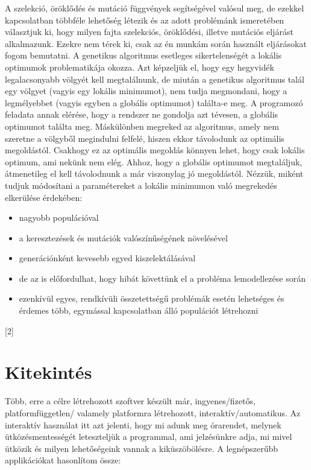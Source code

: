 \documentclass[12pt,a4paper]{report}
\begin{document}
A szelekció, öröklődés és mutáció függvények segítségével valósul meg, de ezekkel
kapcsolatban többféle lehetőség létezik és az adott problémánk ismeretében választjuk ki,
hogy milyen fajta szelekciós, öröklődési, illetve mutációs eljárást alkalmazunk. Ezekre nem
térek ki, csak az én munkám során használt eljárásokat fogom bemutatni.
A genetikus algoritmus esetleges sikertelenségét a lokális optimumok problematikája okozza. 
Azt képzeljük el, hogy egy hegyvidék legalacsonyabb völgyét kell megtalálnunk, de miután a
genetikus algoritmus talál egy völgyet (vagyis egy lokális minimumot), nem tudja megmondani,
hogy a legmélyebbet (vagyis egyben a globális optimumot) találta-e meg. A programozó feladata
annak elérése, hogy a rendszer ne gondolja azt tévesen, a globális optimumot találta meg. 
Máskülönben megreked az algoritmus, amely nem szeretne a völgyből megindulni felfelé, hiszen 
ekkor távolodunk az optimális megoldástól. Csakhogy ez az optimális megoldás könnyen lehet,
hogy csak lokális optimum, ami nekünk nem elég. Ahhoz, hogy a globális optimumot megtaláljuk,
átmenetileg el kell távolodnunk a már viszonylag jó megoldástól. Nézzük, miként tudjuk
módosítani a paramétereket a lokális minimumon való megrekedés elkerülése érdekében:

\begin{itemize}
    \item nagyobb populációval
    \item a keresztezések és mutációk valószínűségének növelésével
    \item generációnként kevesebb egyed kiszelektálásával
    \item de az is előfordulhat, hogy hibát követtünk el a probléma lemodellezése során
    \item ezenkívül egyes, rendkívüli összetettségű problémák esetén lehetséges és érdemes                 több, egymással kapcsolatban álló populációt létrehozni
\end{itemize}
[2]

\section{Kitekintés}

Több, erre a célre létrehozott szoftver készült már, ingyenes/fizetős, platformfüggetlen/
valamely platformra létrehozott, interaktív/automatikus. Az interaktív használat itt azt
jelenti, hogy mi adunk meg órarendet, melynek ütközésmentességét leteszteljük a programmal,
ami jelzésünkre adja, mi mivel ütközik és milyen lehetőségeink vannak a kiküszöbölésre. 
A legnépszerűbb applikációkat hasonlítom össze:
\end{document}
